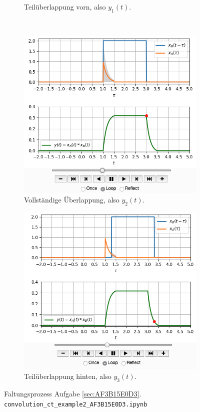 \begin{figure}[h!]
\begin{subfigure}{0.45\textwidth}
\caption{Teilüberlappung vorn, also $y_1(t)$.}
\label{fig:AF3B15E0D3_v2_1}
\end{subfigure}
\\
\begin{subfigure}{0.45\textwidth}
\centering
\includegraphics[width=\textwidth]{../convolution_ct/conv_var2_2_AF3B15E0D3.png}
\caption{Vollständige Überlappung, also $y_2(t)$.}
\label{fig:AF3B15E0D3_v2_2}
\end{subfigure}
\begin{subfigure}{0.45\textwidth}
\centering
\includegraphics[width=\textwidth]{../convolution_ct/conv_var2_3_AF3B15E0D3.png}
\caption{Teilüberlappung hinten, also $y_3(t)$.}
\label{fig:AF3B15E0D3_v2_3}
\end{subfigure}
%
\caption{Faltungsprozess Aufgabe \ref{sec:AF3B15E0D3}.
\texttt{convolution\_ct\_example2\_AF3B15E0D3.ipynb}}
\label{fig:AF3B15E0D3_v2}
\end{figure}



